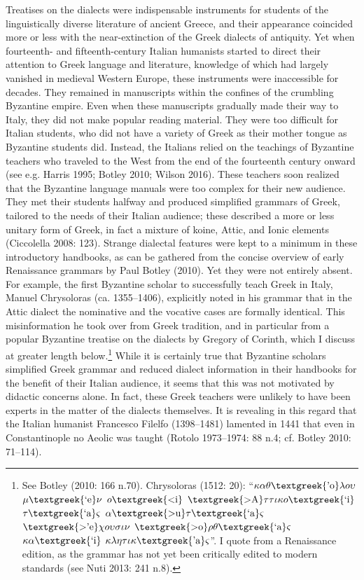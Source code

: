 \documentclass[12pt]{article}
\newenvironment{styleStandard}{\renewcommand\baselinestretch{1.25}\setlength\leftskip{0in}\setlength\rightskip{0in}\setlength\parindent{0.1972in}\setlength\parfillskip{0pt plus 1fil}\setlength\parskip{0in plus 1pt}\writerlistparindent\writerlistleftskip\leavevmode\normalfont\normalsize\writerlistlabel\ignorespaces}{\unskip\vspace{0in plus 1pt}\par}
\newcommand\writerlistleftskip{}
\newcommand\writerlistparindent{}
\newcommand\writerlistlabel{}
\begin{document}
\begin{styleStandard}
Treatises on the dialects were indispensable instruments for students of the linguistically diverse literature of ancient Greece, and their appearance coincided more or less with the near-extinction of the Greek dialects of antiquity. Yet when fourteenth- and fifteenth-century Italian humanists started to direct their attention to Greek language and literature, knowledge of which had largely vanished in medieval Western Europe, these instruments were inaccessible for decades. They remained in manuscripts within the confines of the crumbling Byzantine empire. Even when these manuscripts gradually made their way to Italy, they did not make popular reading material. They were too difficult for Italian students, who did not have a variety of Greek as their mother tongue as Byzantine students did. Instead, the Italians relied on the teachings of Byzantine teachers who traveled to the West from the end of the fourteenth century onward (see e.g. Harris 1995; Botley 2010; Wilson 2016). These teachers soon realized that the Byzantine language manuals were too complex for their new audience. They met their students halfway and produced simplified grammars of Greek, tailored to the needs of their Italian audience; these described a more or less unitary form of Greek, in fact a mixture of koine, Attic, and Ionic elements (Ciccolella 2008: 123). Strange dialectal features were kept to a minimum in these introductory handbooks, as can be gathered from the concise overview of early Renaissance grammars by Paul Botley (2010). Yet they were not entirely absent. For example, the first Byzantine scholar to successfully teach Greek in Italy, Manuel Chrysoloras (ca. 1355–1406), explicitly noted in his grammar that in the Attic dialect the nominative and the vocative cases are formally identical. This misinformation he took over from Greek tradition, and in particular from a popular Byzantine treatise on the dialects by Gregory of Corinth, which I discuss at greater length below.\footnote{ See Botley (2010: 166 n.70). Chrysoloras (1512: 20): “$\kappa \alpha \theta \text{\textgreek{'o}}\lambda o\upsilon $ $\mu \text{\textgreek{`e}}\nu $ $o\text{\textgreek{<i}}$ $\text{\textgreek{>A}}\tau \tau \iota \kappa o\text{\textgreek{`i}}$ $\tau \text{\textgreek{`a}}\varsigma $ $\alpha \text{\textgreek{>u}}\tau \text{\textgreek{`a}}\varsigma $ $\text{\textgreek{>'e}}\chi o\upsilon \sigma \iota \nu $ $\text{\textgreek{>o}}\rho \theta \text{\textgreek{`a}}\varsigma $ $\kappa \alpha \text{\textgreek{`i}}$ $\kappa \lambda \eta \tau \iota \kappa \text{\textgreek{'a}}\varsigma $”. I quote from a Renaissance edition, as the grammar has not yet been critically edited to modern standards (see Nuti 2013: 241 n.8).} While it is certainly true that Byzantine scholars simplified Greek grammar and reduced dialect information in their handbooks for the benefit of their Italian audience, it seems that this was not motivated by didactic concerns alone. In fact, these Greek teachers were unlikely to have been experts in the matter of the dialects themselves. It is revealing in this regard that the Italian humanist Francesco Filelfo (1398–1481) lamented in 1441 that even in Constantinople no Aeolic was taught (Rotolo 1973–1974: 88 n.4; cf. Botley 2010: 71–114).

\end{styleStandard}
\end{document}
